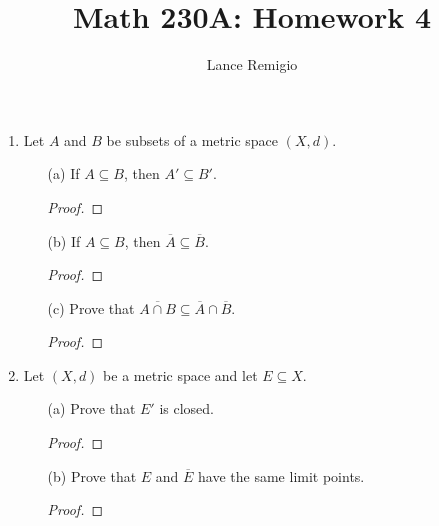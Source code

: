 \documentclass[a4paper]{article}
\title{Math 230A: Homework 4}
\author{Lance Remigio}
\begin{document}
\maketitle    
{}
\rhead{\thepage}

\begin{enumerate}
    \item Let \( A  \) and \( B  \) be subsets of a metric space \( (X,d) \).
        \begin{enumerate}
            \item[(a)] If \( A \subseteq B  \), then \( A' \subseteq B' \).
                \begin{proof}
                
                \end{proof}
            \item[(b)] If \( A \subseteq  B  \), then \( \overline{A} \subseteq \overline{B} \).
                \begin{proof}
                
                \end{proof}
            \item[(c)] Prove that \( \overline{A \cap B} \subseteq \overline{A} \cap \overline{B} \).
                \begin{proof}
                
                \end{proof}
        \end{enumerate}
    \item Let \( (X,d) \) be a metric space and let \( E \subseteq X  \).
        \begin{enumerate}
            \item[(a)] Prove that \( E' \) is closed.
                \begin{proof}
                
                \end{proof}
            \item[(b)] Prove that \( E  \) and \( \overline{E} \) have the same limit points.
                \begin{proof}
                

\end{proof}
\end{enumerate}
\end{enumerate}
\end{document}
